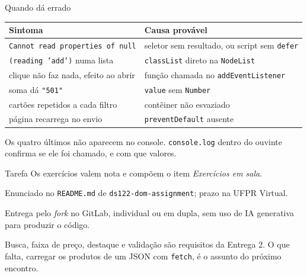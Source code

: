 \documentclass{beamer}
\begin{document}
\begin{frame}{Quando dá errado}
	\small
	\begin{tabular}{>{\raggedright\arraybackslash}p{}>{\raggedright\arraybackslash}p{}}
		\toprule
		Sintoma & Causa provável \\
		\midrule
		\texttt{Cannot read properties of null} & seletor sem resultado, ou
		script sem \texttt{defer} \\ \midrule
		\texttt{(reading 'add')} numa lista & \texttt{classList} direto na
		\texttt{NodeList} \\ \midrule
		clique não faz nada, efeito ao abrir & função chamada no
		\texttt{addEventListener} \\ \midrule
		soma dá \texttt{"501"} & \texttt{value} sem \texttt{Number} \\ \midrule
		cartões repetidos a cada filtro & contêiner não esvaziado \\ \midrule
		página recarrega no envio & \texttt{preventDefault} ausente \\
		\bottomrule
	\end{tabular}

	\vspace{0.3cm}
	Os quatro últimos não aparecem no console. \texttt{console.log} dentro do
	ouvinte confirma se ele foi chamado, e com que valores.
\end{frame}

\begin{frame}{Tarefa}
	Os exercícios valem nota e compõem o item \emph{Exercícios em sala}.

	\vspace{0.3cm}
	Enunciado no \texttt{README.md} de \texttt{ds122-dom-assignment}; prazo na
	UFPR Virtual.

	\vspace{0.3cm}
	Entrega pelo \emph{fork} no GitLab, individual ou em dupla, sem uso de IA
	generativa para produzir o código.

	\vspace{0.5cm}
	Busca, faixa de preço, destaque e validação são requisitos da Entrega 2. O
	que falta, carregar os produtos de um JSON com \texttt{fetch}, é o assunto do
	próximo encontro.
\end{frame}
\end{document}
